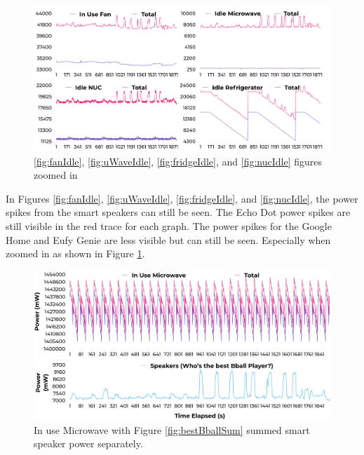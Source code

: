 \begin{figure}[H]
    \centering
    \includegraphics[width=1\textwidth]{figures/allIdleNoise.png}
    \caption{\ref{fig:fanIdle}, \ref{fig:uWaveIdle}, \ref{fig:fridgeIdle}, and \ref{fig:nucIdle} figures zoomed in}
    \label{fig:allIdleNoise}
  \end{figure}

In Figures \ref{fig:fanIdle}, \ref{fig:uWaveIdle}, \ref{fig:fridgeIdle}, and \ref{fig:nucIdle}, the power spikes from the smart speakers can still be seen. The Echo Dot power spikes are still visible in the red trace for each graph. The power spikes for the Google Home and Eufy Genie are less visible but can still be seen. Especially when zoomed in as shown in Figure \ref{fig:allIdleNoise}.

\begin{figure}[H]
  \centering
  \includegraphics[width=1\textwidth]{figures/inUseuWaveNoiseSeperate.png}
  \caption{In use Microwave with Figure \ref{fig:bestBballSum} summed smart speaker power separately.}
  \label{fig:uWaveInUseSeperate}
\end{figure}

